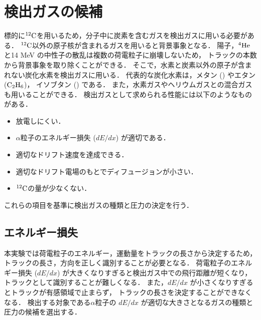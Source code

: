 \documentclass[../master]{subfiles}
\begin{document}
\section{検出ガスの候補}
\label{sec::detection_gas_candidate}
標的に${}^{12}{\rm C}$を用いるため，分子中に炭素を含むガスを検出ガスに用いる必要がある．
${}^{12}{\rm C}$以外の原子核が含まれるガスを用いると背景事象となる．
陽子，${}^{4}{\rm He}$と14 MeV の中性子の散乱は複数の荷電粒子に崩壊しないため，
トラックの本数から背景事象を取り除くことができる．
そこで，水素と炭素以外の原子が含まれない炭化水素を検出ガスに用いる．
代表的な炭化水素は，メタン (\Methane) やエタン (${\rm C_{2}H_{6}}$)，
イソブタン (\isoButane) である．
また，水素ガスやヘリウムガスとの混合ガスも用いることができる．
検出ガスとして求められる性能には以下のようなものがある．
\begin{itemize}
\item
  放電しにくい．
\item
  $\alpha$粒子のエネルギー損失 ($dE/dx$) が適切である．
\item
  適切なドリフト速度を達成できる．
\item
  適切なドリフト電場のもとでディフュージョンが小さい．
\item
  ${}^{12}{\rm C}$の量が少なくない．
\end{itemize}
これらの項目を基準に検出ガスの種類と圧力の決定を行う．

\subsection{エネルギー損失}
本実験では荷電粒子のエネルギー，運動量をトラックの長さから決定するため，
トラックの長さ，方向を正しく識別することが必要となる．
荷電粒子のエネルギー損失 ($dE/dx$) が大きくなりすぎると検出ガス中での飛行距離が短くなり，
トラックとして識別することが難しくなる．
また，$dE/dx$ が小さくなりすぎるとトラックが有感領域で止まらず，
トラックの長さを決定することができなくなる．
検出する対象である$\alpha$粒子の $dE/dx$ が適切な大きさとなるガスの種類と圧力の候補を選出する．
\end{document}
